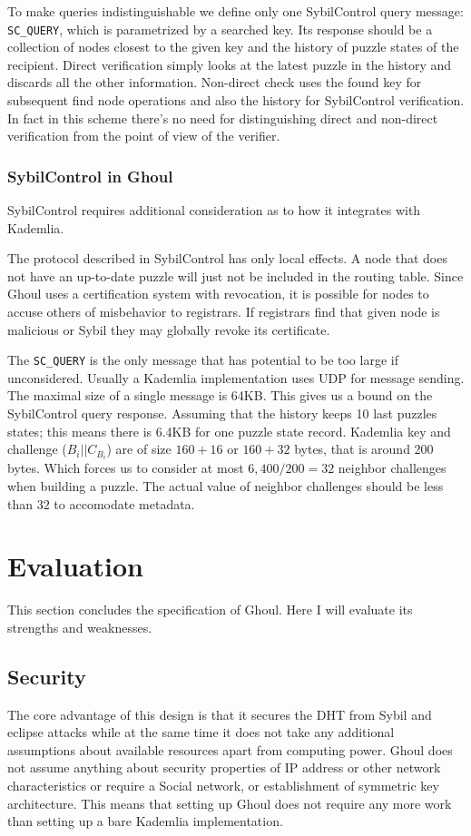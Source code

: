   To make queries indistinguishable we define only one SybilControl query
  message: \texttt{SC\_QUERY}, which is parametrized by a searched key. Its
  response should be a collection of nodes closest to the given key and the
  history of puzzle states of the recipient.
  Direct verification simply looks at the latest puzzle in the history and
  discards all the other information.
  Non-direct check uses the found key for subsequent find node operations and
  also the history for SybilControl verification.
  In fact in this scheme there's no need for distinguishing direct and
  non-direct verification from the point of view of the verifier.

\subsubsection{SybilControl in Ghoul}
  SybilControl requires additional consideration as to how it integrates with
  Kademlia.

  The protocol described in SybilControl has only local effects.
  A node that does not have an up-to-date puzzle will just not be included in
  the routing table.
  Since Ghoul uses a certification system with revocation, it is possible for
  nodes to accuse others of misbehavior to registrars.
  If registrars find that given node is malicious or Sybil they may globally
  revoke its certificate.

  The \texttt{SC\_QUERY} is the only message that has potential to be too large
  if unconsidered.
  Usually a Kademlia implementation uses UDP for message sending.
  The maximal size of a single message is 64KB.
  This gives us a bound on the SybilControl query response.
  Assuming that the history keeps 10 last puzzles states; this means there is
  6.4KB for one puzzle state record.
  Kademlia key and challenge ($B_i || C_{B_i}$) are of size $160 + 16$ or $160 +
  32$ bytes, that is around 200 bytes.
  Which forces us to consider at most $6,400/200 = 32$ neighbor challenges when
  building a puzzle.
  The actual value of neighbor challenges should be less than $32$ to accomodate
  metadata.
\section{Evaluation}
\label{sec:ghoul_summary}
  This section concludes the specification of Ghoul. Here I will evaluate its
  strengths and weaknesses.
  
  \subsection{Security}
  The core advantage of this design is that it secures the DHT from Sybil and
  eclipse attacks while at the same time it does not take any additional
  assumptions about available resources apart from computing power. Ghoul does
  not assume anything about security properties of IP address or other network
  characteristics or require a Social network, or establishment of symmetric key
  architecture.  This means that setting up Ghoul does not require any more work
  than setting up a bare Kademlia implementation.

